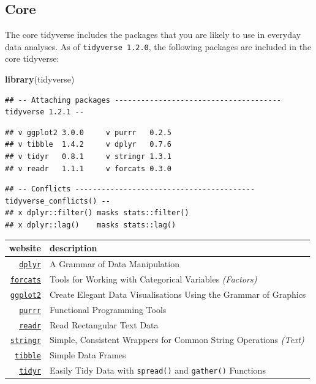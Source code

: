 \documentclass[]{book}
\newenvironment{Shaded}{\begin{snugshade}}{\end{snugshade}}
\newcommand{\KeywordTok}[1]{\textcolor[rgb]{0.13,0.29,0.53}{\textbf{#1}}}
\newcommand{\NormalTok}[1]{#1}
\theoremstyle{definition}
\theoremstyle{definition}
\theoremstyle{definition}
\theoremstyle{remark}
\begin{document}
\subsection{Core}\label{core}

The core tidyverse includes the packages that you are likely to use in
everyday data analyses. As of \texttt{tidyverse\ 1.2.0}, the following
packages are included in the core tidyverse:

\begin{Shaded}
\begin{Highlighting}[]
\KeywordTok{library}\NormalTok{(tidyverse)}
\end{Highlighting}
\end{Shaded}

\begin{verbatim}
## -- Attaching packages -------------------------------------- tidyverse 1.2.1 --
\end{verbatim}

\begin{verbatim}
## v ggplot2 3.0.0     v purrr   0.2.5
## v tibble  1.4.2     v dplyr   0.7.6
## v tidyr   0.8.1     v stringr 1.3.1
## v readr   1.1.1     v forcats 0.3.0
\end{verbatim}

\begin{verbatim}
## -- Conflicts ----------------------------------------- tidyverse_conflicts() --
## x dplyr::filter() masks stats::filter()
## x dplyr::lag()    masks stats::lag()
\end{verbatim}

\begin{longtable}[]{@{}rl@{}}
\toprule
website & description\tabularnewline
\midrule
\endhead
\href{https://dplyr.tidyverse.org/}{\texttt{dplyr}} & A Grammar of Data
Manipulation\tabularnewline
\href{https://forcats.tidyverse.org/}{\texttt{forcats}} & Tools for
Working with Categorical Variables \emph{(Factors)}\tabularnewline
\href{https://ggplot2.tidyverse.org/}{\texttt{ggplot2}} & Create Elegant
Data Visualisations Using the Grammar of Graphics\tabularnewline
\href{https://purrr.tidyverse.org/}{\texttt{purrr}} & Functional
Programming Tools\tabularnewline
\href{https://readr.tidyverse.org/}{\texttt{readr}} & Read Rectangular
Text Data\tabularnewline
\href{https://stringr.tidyverse.org/}{\texttt{stringr}} & Simple,
Consistent Wrappers for Common String Operations
\emph{(Text)}\tabularnewline
\href{https://tibble.tidyverse.org/}{\texttt{tibble}} & Simple Data
Frames\tabularnewline
\href{https://tidyr.tidyverse.org/}{\texttt{tidyr}} & Easily Tidy Data
with \texttt{spread()} and \texttt{gather()} Functions\tabularnewline
\bottomrule
\end{longtable}
\end{document}
